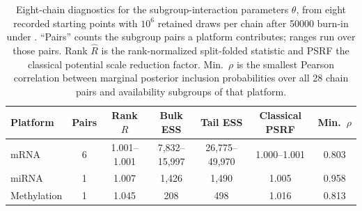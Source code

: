 \begin{table}[!ht]
\centering
\begin{tabular}{l c c c c c c}
\toprule
Platform & Pairs & Rank $\widehat{R}$ & Bulk ESS & Tail ESS & Classical PSRF &
Min.\ $\rho$ \\
\midrule
mRNA        & 6 & 1.001--1.001 & 7,832--15,997 & 26,775--49,970 & 1.000--1.001 & 0.803 \\
miRNA       & 1 & 1.007        & 1,426         & 1,490          & 1.005        & 0.958 \\
Methylation & 1 & 1.045        & 208           & 498            & 1.016        & 0.813 \\
\bottomrule
\end{tabular}
\caption{\label{tab:chain-diagnostics}Eight-chain diagnostics for the
subgroup-interaction parameters $\theta$, from eight recorded starting points
with $10^6$ retained draws per chain after 50000 burn-in under
. ``Pairs'' counts the subgroup pairs a
platform contributes; ranges run over those pairs. Rank $\widehat{R}$ is the
rank-normalized split-folded statistic and PSRF the classical potential scale
reduction factor. Min.\ $\rho$ is the smallest Pearson correlation between
marginal posterior inclusion probabilities over all 28 chain pairs and
availability subgroups of that platform.}
\end{table}
